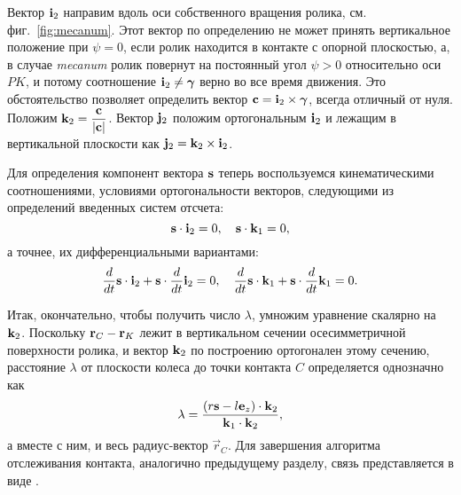 Вектор ${\bf i}_2$ направим вдоль оси собственного вращения ролика, см. фиг.~\ref{fig:mecanum}. Этот вектор по определению не может принять вертикальное положение при $\psi = 0$, если ролик находится в контакте с опорной плоскостью, а, в случае \textit{mecanum} ролик повернут на постоянный угол $\psi > 0$ относительно оси $PK$, и потому соотношение ${\bf i}_2 \ne \vec{\gamma}$ верно во все время движения. Это обстоятельство позволяет определить вектор ${\bf c} = {\bf i}_2 \times \vec{\gamma}$, всегда отличный от нуля. Положим ${\bf k}_2 = \ddfrac{\vec{c}}{|\vec{c}|}$. Вектор ${\bf j}_2$ положим ортогональным ${\bf i}_2$ и лежащим в вертикальной плоскости как ${\bf j}_2 = {\bf k}_2 \times {\bf i}_2$.

Для определения компонент вектора $\vecrho$ теперь воспользуемся кинематическими соотношениями, условиями ортогональности векторов, следующими из определений введенных систем отсчета:
$$
    \vecrho \cdot {\bf i}_2 = 0, \quad \vecrho \cdot {\bf k}_1 = 0,
$$
а точнее, их дифференциальными вариантами:
$$
    \dfrac{d}{dt} \vecrho \cdot {\bf i}_2 + \vecrho \cdot \dfrac{d}{dt} {\bf i}_2 = 0, \quad
    \dfrac{d}{dt} \vecrho \cdot {\bf k}_1 + \vecrho \cdot \dfrac{d}{dt} {\bf k}_1 = 0.
$$

Итак, окончательно, чтобы получить число $\lambda$, умножим уравнение скалярно на ${\bf k}_2$. Поскольку ${\bf r}_C - {\bf r}_K$ лежит в вертикальном сечении осесимметричной поверхности ролика, и вектор ${\bf k}_2$ по построению ортогонален этому сечению, расстояние $\lambda$ от плоскости колеса до точки контакта $C$ определяется однозначно как
$$
    \lambda = \ddfrac
        { \left( r\vec{s} - l\vec{e}_z \right) \cdot \vec{k}_2 }
        { \vec{k}_1 \cdot \vec{k}_2 },
$$
а вместе с ним, и весь радиус-вектор $\vec{r}_C$. Для завершения алгоритма отслеживания контакта, аналогично предыдущему разделу, связь представляется в виде .
